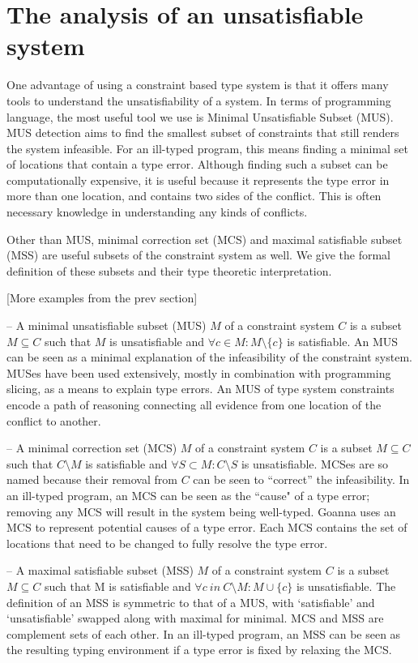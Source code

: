\section{The analysis of an unsatisfiable system}

One advantage of using a constraint based type system is that it offers many tools to understand the unsatisfiability of a system. In terms of programming language, the most useful tool we use is Minimal Unsatisfiable Subset (MUS).  MUS detection aims to find the smallest subset of constraints that still renders the system infeasible. For an ill-typed program, this means finding a minimal set of locations that contain a type error. Although finding such a subset can be computationally expensive, it is useful because it represents the type error in more than one location, and contains two sides of the conflict. This is often necessary knowledge in understanding any kinds of conflicts.


Other than MUS, minimal correction set (MCS) and  maximal satisfiable subset (MSS) are useful subsets of the constraint system as well. We give the formal definition of these subsets and their type theoretic interpretation.


[More examples from the prev section]


– A minimal unsatisfiable subset (MUS) $M$ of a constraint system $C$ is a subset $M \subseteq C$ such that $M$ is unsatisfiable and $ \forall{c} \in M : M \setminus \{c\}$ is satisfiable. An MUS can be seen as a minimal explanation of the infeasibility of the constraint system. MUSes have been used extensively, mostly in combination with programming slicing, as a means to explain type errors. An MUS of type system constraints encode a path of reasoning connecting all evidence from one location of the conflict to another.


– A minimal correction set (MCS) $M$ of a constraint system $C$ is a subset $M \subseteq C$ such that $C \setminus M$ is satisfiable and $\forall{S} \subset M : C \setminus S$ is unsatisfiable. MCSes are so named because their removal from $C$ can be seen to “correct” the infeasibility. In an ill-typed program, an MCS can be seen as the ``cause" of a type error; removing any MCS will result in the system being well-typed. Goanna uses an MCS to represent potential causes of a type error. Each MCS contains the set of locations that need to be changed to fully resolve the type error.

  

– A maximal satisfiable subset (MSS) $M$ of a constraint system $C$ is a subset $M \subseteq C$ such that M is satisfiable and $\forall{c}\ in\ C \setminus M:M\cup\{c\}$ is unsatisfiable. The definition of an MSS is symmetric to that of a MUS, with `satisfiable' and `unsatisfiable' swapped along with maximal for minimal. MCS and MSS are complement sets of each other. In an ill-typed program, an MSS can be seen as the resulting typing environment if a type error is fixed by relaxing the MCS.

